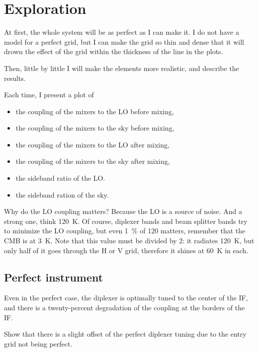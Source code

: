 \section{Exploration}

At first, the whole system will be as perfect as I can make it.  I do not have a model for a perfect grid, but I can make the grid so thin and dense that it will drown the effect of the grid within the thickness of the line in the plots.

Then, little by little I will make the elements more realistic, and describe the results.

Each time, I present a plot of
\begin{itemize}
    \item the coupling of the mixers to the LO before mixing,
    \item the coupling of the mixers to the sky before mixing,
    \item the coupling of the mixers to the LO after mixing,
    \item the coupling of the mixers to the sky after mixing,
    \item the sideband ratio of the LO.
    \item the sideband ration of the sky.
\end{itemize}

Why do the LO coupling matters?
Because the LO is a source of noise.
And a strong one, think \SI{120}{\kelvin}.
Of course, diplexer bands and beam splitter bands try to minimize the LO coupling, but even \SI{1}{\percent} of \si{120}{\kelvin} matters, remember that the CMB is at \SI{3}{\kelvin}.
Note that this value must be divided by 2: it radiates \SI{120}{\kelvin}, but only half of it goes through the H or V grid, therefore it shines at \SI{60}{\kelvin} in each.

\clearpage
\subsection{Perfect instrument}
Even in the perfect case, the diplexer is optimally tuned to the center of the IF, and there is a twenty-percent degradation of the coupling at the borders of the IF.

Show that there is a slight offset of the perfect diplexer tuning due to the entry grid not being perfect.

